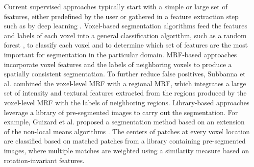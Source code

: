 

Current supervised approaches typically start with a simple or large set of
features, either predefined by the user
\cite{geremia2010,guizard2015,subbanna2015} or gathered in a feature extraction
step such as by deep learning \cite{yoo2014}. Voxel-based segmentation
algorithms \cite{geremia2010,yoo2014} feed the features and labels of each
voxel into a general classification algorithm, such as a random forest
\cite{breiman2001}, to classify each voxel and to determine which set of features are the most
important for segmentation in the particular domain. MRF-based approaches
\cite{subbanna2009,subbanna2015} incorporate voxel features and the labels of
neighboring voxels to produce a spatially consistent segmentation. To further
reduce false positives, Subbanna et al.
\cite{subbanna2015} combined the voxel-level MRF with a regional MRF, which
integrates a large set of intensity and textural features extracted from the
regions produced by the voxel-level MRF with the labels of neighboring regions.
Library-based approaches leverage a library of pre-segmented images to carry out
the segmentation. For example, Guizard et al.
\cite{guizard2015} proposed a segmentation method based on an extension of the
non-local means algorithms \cite{coupe2011}. The centers of patches at every
voxel location are classified based on matched patches from a library containing
pre-segmented images, where multiple matches are weighted using a similarity
measure based on rotation-invariant features.

